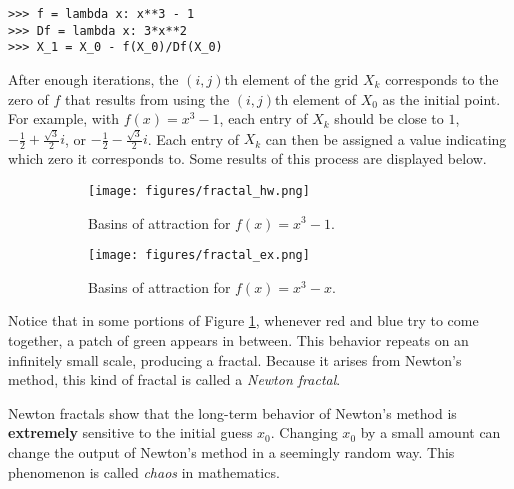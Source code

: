 \begin{lstlisting}
>>> f = lambda x: x**3 - 1
>>> Df = lambda x: 3*x**2
>>> X_1 = X_0 - f(X_0)/Df(X_0)
\end{lstlisting}

After enough iterations, the $(i,j)$th element of the grid $X_k$ corresponds to the zero of $f$ that results from using the $(i,j)$th element of $X_0$ as the initial point.
For example, with $f(x) = x^3 - 1$, each entry of $X_k$ should be close to $1$, $-\frac{1}{2} + \frac{\sqrt{3}}{2}i$, or $-\frac{1}{2} - \frac{\sqrt{3}}{2}i$.
Each entry of $X_k$ can then be assigned a value indicating which zero it corresponds to.
Some results of this process are displayed below.

\begin{figure}[H]
\centering
\begin{subfigure}{.49\textwidth}
    \centering
    \texttt{[image: figures/fractal\_hw.png]}
    \caption{Basins of attraction for $f(x) = x^3-1$.}
    \label{fig:fractal_hw}
\end{subfigure}
\begin{subfigure}{.49\textwidth}
    \centering
    \texttt{[image: figures/fractal\_ex.png]}
    \caption{Basins of attraction for $f(x) = x^3-x$.}
    \label{fig:fractal_ex}
\end{subfigure}
\caption{}
\label{fig:newton-basins}
\end{figure}

\begin{info} %
Notice that in some portions of Figure \ref{fig:fractal_hw}, whenever red and blue try to come together, a patch of green appears in between.
This behavior repeats on an infinitely small scale, producing a fractal.
Because it arises from Newton's method, this kind of fractal is called a \emph{Newton fractal}.

Newton fractals show that the long-term behavior of Newton's method is \textbf{extremely} sensitive to the initial guess $x_0$.
Changing $x_0$ by a small amount can change the output of Newton's method in a seemingly random way.
This phenomenon is called \emph{chaos} in mathematics.
\end{info}

